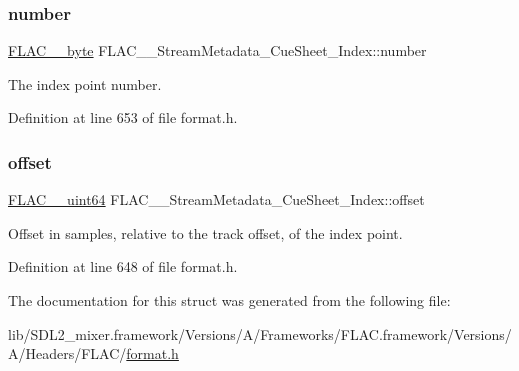 \subsubsection{\texorpdfstring{number}{number}}
{\footnotesize\ttfamily \mbox{\hyperlink{ordinals_8h_a5eb569b12d5b047cdacada4d57924ee3}{F\+L\+A\+C\+\_\+\+\_\+byte}} F\+L\+A\+C\+\_\+\+\_\+\+Stream\+Metadata\+\_\+\+Cue\+Sheet\+\_\+\+Index\+::number}

The index point number. 

Definition at line 653 of file format.\+h.

\mbox{\label{struct_f_l_a_c_____stream_metadata___cue_sheet___index_ac221421bca83976925e2a41438157bb9}} 
\subsubsection{\texorpdfstring{offset}{offset}}
{\footnotesize\ttfamily \mbox{\hyperlink{ordinals_8h_aa78c8c70a3eb8a58af7436f278acde8e}{F\+L\+A\+C\+\_\+\+\_\+uint64}} F\+L\+A\+C\+\_\+\+\_\+\+Stream\+Metadata\+\_\+\+Cue\+Sheet\+\_\+\+Index\+::offset}

Offset in samples, relative to the track offset, of the index point. 

Definition at line 648 of file format.\+h.



The documentation for this struct was generated from the following file\+:\begin{DoxyCompactItemize}
\item 
lib/\+S\+D\+L2\+\_\+mixer.\+framework/\+Versions/\+A/\+Frameworks/\+F\+L\+A\+C.\+framework/\+Versions/\+A/\+Headers/\+F\+L\+A\+C/\mbox{\hyperlink{format_8h}{format.\+h}}\end{DoxyCompactItemize}
